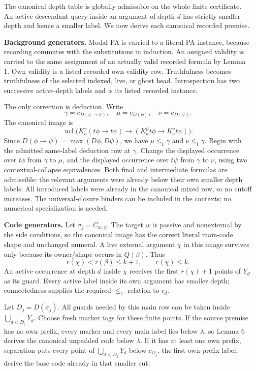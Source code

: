 \documentclass[
  11pt,
  letterpaper,
]{article}
\newcounter{none} %
\begin{document}
The canonical depth table is globally admissible on the whole finite
certificate. An active descendant query inside an argument of depth
\(d\) has strictly smaller depth and hence a smaller label. We now
derive each canonical recorded premise.

\textbf{Background generators.} Modal PA is carried to a literal PA
instance, because recording commutes with the substitutions in
induction. An assigned validity is carried to the same assignment of an
actually valid recorded formula by Lemma 1. Own validity is a listed
recorded own-validity row. Truthfulness becomes truthfulness of the
selected indexed, live, or ghost head. Introspection has two successive
active-depth labels and is its listed recorded instance.

The only correction is deduction. Write \[
\gamma=c_{D(\phi\to\psi)},\quad
\mu=c_{D(\phi)},\quad \nu=c_{D(\psi)}.
\] The canonical image is \[
\operatorname{ucl}\bigl(
K_a^\gamma(t\phi\to t\psi)\to
(K_a^\mu t\phi\to K_a^\nu t\psi)\bigr).
\] Since \(D(\phi\to\psi)=\max(D\phi,D\psi)\), we have
\(\mu\leq_1\gamma\) and \(\nu\leq_1\gamma\). Begin with the admitted
same-label deduction row at \(\gamma\). Change the displayed occurrence
over \(t\phi\) from \(\gamma\) to \(\mu\), and the displayed occurrence
over \(t\psi\) from \(\gamma\) to \(\nu\), using two contextual-collapse
equivalences. Both final and intermediate formulas are admissible: the
relevant arguments were already below their own smaller depth labels.
All introduced labels were already in the canonical mixed row, so no
cutoff increases. The universal-closure binders can be included in the
contexts; no numerical specialization is needed.

\textbf{Code generators.} Let \(\sigma_j=C_{w,\phi}\). The target \(w\)
is passive and nonexternal by the side conditions, so the canonical
image has the correct literal main-code shape and unchanged numeral. A
live external argument \(\chi\) in this image survives only because its
owner/shape occurs in \(Q(\beta)\). Thus \[
r(\chi)<r(\beta)\leq k+1,\qquad r(\chi)\leq k.
\] An active occurrence at depth \(d\) inside \(\chi\) receives the
first \(r(\chi)+1\) points of \(Y_d\) as its guard. Every active label
inside its own argument has smaller depth; connectedness supplies the
required \(\leq_1\) relation to \(c_d\).

Let \(D_j=D(\sigma_j)\). All guards needed by this main row can be taken
inside \(\bigcup_{d<D_j}Y_d\). Choose fresh marker tags for these finite
points. If the source premise has no own prefix, every marker and every
main label lies below \(\lambda\), so Lemma 6 derives the canonical
unpadded code below \(\lambda\). If it has at least one own prefix,
separation puts every point of \(\bigcup_{d<D_j}Y_d\) below \(c_{D_j}\),
the first own-prefix label; derive the base code already in that smaller
cut.
\end{document}
